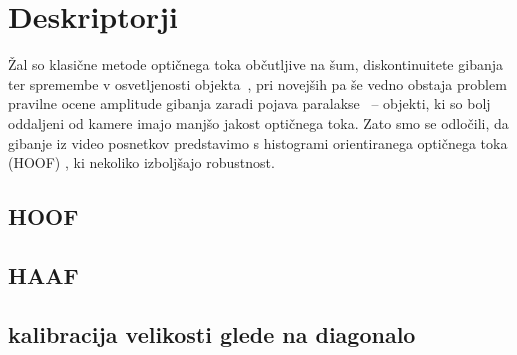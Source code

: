 \section{Deskriptorji}
Žal so klasične metode optičnega toka občutljive na šum, diskontinuitete gibanja ter spremembe v osvetljenosti objekta~\cite{brox2011large}, pri novejših pa še vedno obstaja problem pravilne ocene amplitude gibanja zaradi pojava paralakse~\cite{xu2012scale} -- objekti, ki so bolj oddaljeni od kamere imajo manjšo jakost optičnega toka. Zato smo se odločili, da gibanje iz video posnetkov predstavimo s histogrami orientiranega optičnega toka (HOOF) \cite{chaudhry2009histograms}, ki nekoliko izboljšajo robustnost.


\subsection{HOOF}

\subsection{HAAF}

\subsection{kalibracija velikosti glede na diagonalo}
